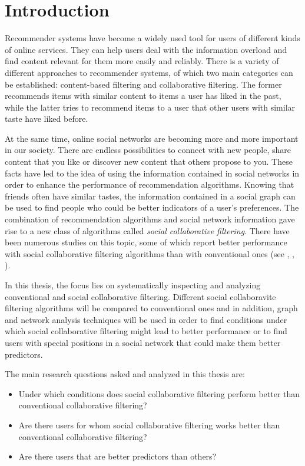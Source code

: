 \chapter{Introduction}
\label{c:introduction} Recommender systems have become a widely used tool for users of different kinds of online services. They can help users deal with the information overload and find content relevant for them more easily and reliably. There is a variety of different approaches to recommender systems, of which two main categories can be established: content-based filtering and collaborative filtering. The former recommends items with similar content to items a user has liked in the past, while the latter tries to recommend items to a user that other users with similar taste have liked before.

At the same time, online social networks are becoming more and more important in our society. There are endless possibilities to connect with new people, share content that you like or discover new content that others propose to you. These facts have led to the idea of using the information contained in social networks in order to enhance the performance of recommendation algorithms. Knowing that friends often have similar tastes, the information contained in a social graph can be used to find people who could be better indicators of a user's preferences. The combination of recommendation algorithms and social network information gave rise to a new class of algorithms called \textit{social collaborative filtering}. There have been numerous studies on this topic, some of which report better performance with social collaborative filtering algorithms than with conventional ones (see \cite{Zheng_2008}, \cite{Konstas_2009}, \cite{Liu_2010}).

In this thesis, the focus lies on systematically inspecting and analyzing conventional and social collaborative filtering. Different social collaboravite filtering algorithms will be compared to conventional ones and in addition, graph and network analysis techniques will be used in order to find conditions under which social collaborative filtering might lead to better performance or to find users with special positions in a social network that could make them better predictors.

The main research questions asked and analyzed in this thesis are:
\begin{itemize}
\item Under which conditions does social collaborative filtering perform better than conventional collaborative filtering?
\item Are there users for whom social collaborative filtering works better than conventional collaborative filtering?
\item Are there users that are better predictors than others?
\end{itemize}

